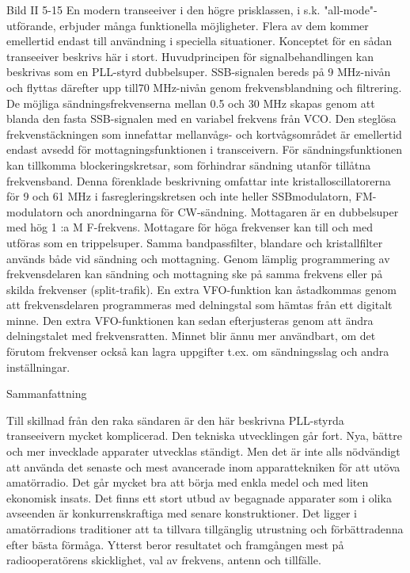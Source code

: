 \documentclass[a4paper,twoside,twocolumn,openright]{book}
\begin{document}
{{{Bild II 5-15
En modern transeeiver i den högre prisklassen, i s.k. "all-mode"-utförande, erbjuder många funktionella möjligheter. Flera av
dem kommer emellertid endast till användning i speciella situationer. Konceptet
för en sådan transeeiver beskrivs här i stort.
Huvudprincipen för signalbehandlingen kan
beskrivas som en PLL-styrd dubbelsuper.
SSB-signalen bereds på 9 MHz-nivån och
flyttas därefter upp till70 MHz-nivån genom
frekvensblandning och filtrering. De möjliga
sändningsfrekvenserna mellan 0.5 och 30
MHz skapas genom att blanda den fasta
SSB-signalen med en variabel frekvens från
VCO. Den steglösa frekvenstäckningen som
innefattar mellanvågs- och kortvågsområdet är emellertid endast avsedd för mottagningsfunktionen i transceivern. För sändningsfunktionen kan tillkomma blockeringskretsar, som förhindrar sändning utanför
tillåtna frekvensband.
Denna förenklade beskrivning omfattar
inte kristalloscillatorerna för 9 och 61 MHz i
fasregleringskretsen och inte heller SSBmodulatorn, FM-modulatorn och anordningarna för CW-sändning.
Mottagaren är en dubbelsuper med hög
1 :a M F-frekvens. Mottagare för höga frekvenser kan till och med utföras som en
trippelsuper. Samma bandpassfilter, blandare och kristallfilter används både vid sändning och mottagning.
Genom lämplig programmering av
frekvensdelaren kan sändning och mottagning ske på samma frekvens eller på
skilda frekvenser (split-trafik).
En extra VFO-funktion kan åstadkommas genom att frekvensdelaren programmeras med delningstal som hämtas från ett
digitalt minne. Den extra VFO-funktionen
kan sedan efterjusteras genom att ändra
delningstalet med frekvensratten. Minnet
blir ännu mer användbart, om det förutom
frekvenser också kan lagra uppgifter t.ex.
om sändningsslag och andra inställningar.

Sammanfattning

Till skillnad från den raka sändaren är den
här beskrivna PLL-styrda transeeivern
mycket komplicerad. Den tekniska utvecklingen går fort. Nya, bättre och mer invecklade apparater utvecklas ständigt. Men det
är inte alls nödvändigt att använda det senaste och mest avancerade inom apparattekniken för att utöva amatörradio. Det går
mycket bra att börja med enkla medel och
med liten ekonomisk insats.
Det finns ett stort utbud av begagnade
apparater som i olika avseenden är konkurrenskraftiga med senare konstruktioner. Det
ligger i amatörradions traditioner att ta tillvara tillgänglig utrustning och förbättradenna
efter bästa förmåga.
Ytterst beror resultatet och framgången
mest på radiooperatörens skicklighet, val av
frekvens, antenn och tillfälle.

}}}
\end{document}
